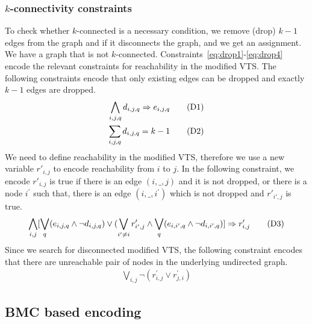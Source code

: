 \subsubsection{$k$-connectivity constraints}
To check whether $k$-connected is a necessary condition, we remove (drop) $k-1$ edges from the graph and if it
disconnects the graph, and we get an assignment. We have a graph that is not  $k$-connected.
%
Constraints~\ref{eq:drop1}-\ref{eq:drop4}
encode the relevant constraints for reachability
in the modified VTS. 
%
The following constraints encode that only
existing edges can be dropped and exactly $k-1$ edges are dropped.
\begin{align}
  \bigwedge\limits_{i,j,q} d_{i,j,q} \Rightarrow e_{i,j,q}  \tag{D1}\label{eq:drop1}\\
  \sum_{i,j,q} d_{i,j,q} = k-1
  \tag{D2}\label{eq:drop2}
\end{align}
We need to define reachability in the modified VTS, therefore we use
a new variable $r'_{i,j}$ to encode reachability from $i$ to $j$.
In the following constraint, we encode $r'_{i,j}$ is true if there is an
edge $(i,\_,j)$ and it is not dropped, or there is a node
$i^{\prime}$ such that, there is an edge $(i,\_,i^{\prime})$ which is
not dropped and $r'_{i',j}$ is true.
\begin{align}
\bigwedge\limits_{i,j}  [\bigvee_{q} (e_{i,j,q} \land  \neg d_{i,j,q}) \lor  (\bigvee_{i' \neq i}  r^{\prime}_{i',j} \land  \bigvee_{q} (e_{i,i',q} \land \neg d_{i,i',q}) ] \Rightarrow r^{\prime}_{i,j}  
  \tag{D3}\label{eq:drop3}
\end{align}
Since we search for disconnected modified VTS,
the following constraint encodes that there are 
unreachable pair of nodes in the underlying undirected graph.
\begin{align}
   \bigvee\limits_{i,j} \neg (r^{\prime}_{i,j} \lor r^{\prime}_{j,i})
  \tag{D4}\label{eq:drop4}
\end{align}



\subsection{BMC based encoding}

